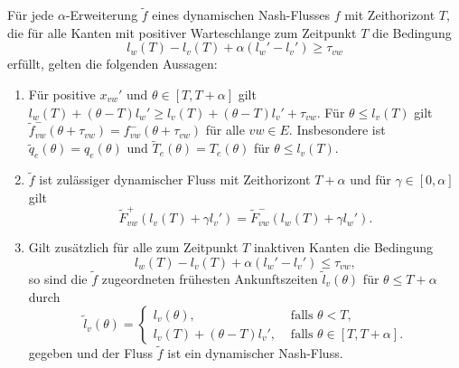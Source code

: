 \begin{theorem}\label{thm-alpha-extension-is-nash-flow}
	Für jede $\alpha$-Erweiterung $\tilde{f}$ eines dynamischen Nash-Flusses $f$ mit Zeithorizont $T$, die für alle Kanten mit positiver Warteschlange zum Zeitpunkt $T$ die Bedingung
	\[ l_w(T) - l_v(T) + \alpha(l_w' - l_v') \geq \tau_{vw} \]
	erfüllt, gelten die folgenden Aussagen:
	\begin{enumerate}[label=(\roman*)]
		\item Für positive $x_{vw}'$ und $\theta\in[T, T+\alpha]$ gilt $l_w(T) + (\theta - T)l_w' \geq l_v(T) + (\theta - T)l_v' + \tau_{vw}$.
		Für $\theta \leq l_v(T)$ gilt $\tilde{f}^-_{vw}(\theta + \tau_{vw})=f^-_{vw}(\theta + \tau_{vw})$ für alle $vw\in E$.
		Insbesondere ist $\tilde{q}_e(\theta) = q_e(\theta)$ und $\tilde{T}_e(\theta) = T_e(\theta)$ für $\theta \leq l_v(T)$.
		\item $\tilde{f}$ ist zulässiger dynamischer Fluss mit Zeithorizont $T+\alpha$ und für $\gamma \in [0, \alpha]$ gilt
		\[ \tilde{F}_{vw}^+(l_v(T) + \gamma l_v') = \tilde{F}_{vw}^-(l_w(T) + \gamma l_w'). \]
		\item Gilt zusätzlich für alle zum Zeitpunkt $T$ inaktiven Kanten die Bedingung \[
		l_w(T) - l_v(T) + \alpha(l_w' -l_v') \leq \tau_{vw},
		\]
		so sind die $\tilde{f}$ zugeordneten frühesten Ankunftszeiten $\tilde{l}_v(\theta)$ für $\theta \leq T+\alpha$ durch
		\[ \tilde{l}_v(\theta) = \begin{cases}
		l_v(\theta), & \text{ falls $\theta < T$,} \\
		l_v(T) + (\theta - T) l_v', & \text{ falls $\theta \in [T, T+\alpha]$.}
		\end{cases}\]
		gegeben und der Fluss $\tilde{f}$ ist ein dynamischer Nash-Fluss.
	\end{enumerate}
\end{theorem}
